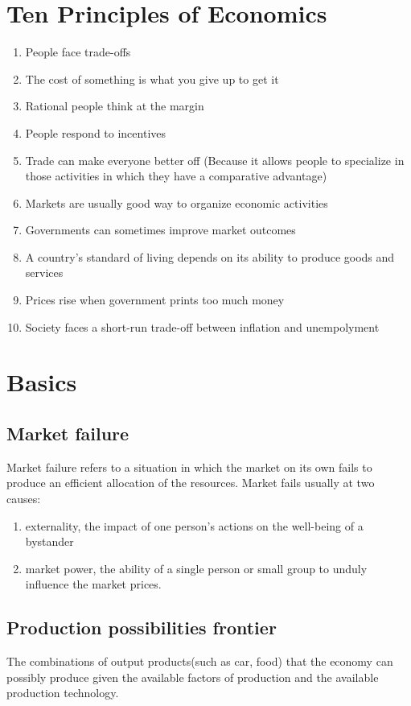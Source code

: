 \documentclass[a4paper,13pt]{report}
\begin{document}
\section{Ten Principles of Economics}
\begin{enumerate}
    \item People face trade-offs
    \item The cost of something is what you give up to get it
    \item Rational people think at the margin
    \item People respond to incentives
    \item Trade can make everyone better off (Because it allows people to specialize in those activities in which they have a comparative advantage)
    \item Markets are usually good way to organize economic activities
    \item Governments can sometimes improve market outcomes
    \item A country's standard of living depends on its ability to produce goods and services
    \item Prices rise when government prints too much money
    \item Society faces a short-run trade-off between inflation and unempolyment
\end{enumerate}

\section{Basics}
\subsection{Market failure}
Market failure refers to a situation in which the market on its own fails to produce an efficient allocation of the resources. Market fails usually at two causes: 
\begin{enumerate}
    \item externality, the impact of one person's actions on the well-being of a bystander
    \item market power, the ability of a single person or small group to unduly influence the market prices. 
\end{enumerate}

\subsection{Production possibilities frontier}
The combinations of output products(such as car, food) that the economy can possibly produce given the available factors of production and the available production technology.
\end{document}
